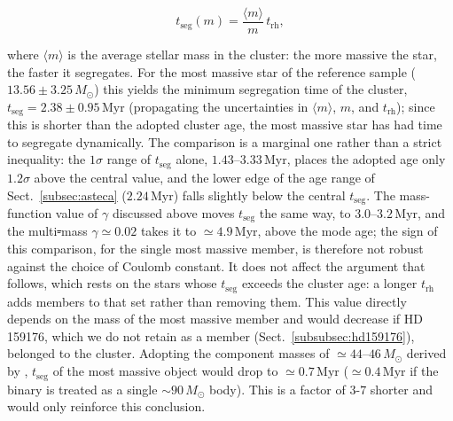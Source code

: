 \documentclass{aa}
\providecommand{\DIFaddtex}[1]{{\protect\color{red}\uwave{#1}}} %
\providecommand{\DIFdeltex}[1]{{\protect\color{red}\sout{#1}}} %
\providecommand{\DIFaddbegin}{} %
\providecommand{\DIFaddend}{} %
\providecommand{\DIFdelbegin}{} %
\providecommand{\DIFdelend}{} %
\providecommand{\DIFadd}[1]{\texorpdfstring{\DIFaddtex{#1}}{#1}} %
\providecommand{\DIFdel}[1]{\texorpdfstring{\DIFdeltex{#1}}{}} %
\providecommand{\DIFscaledelfig}{0.5}
\newlength{\DIFdelgraphicswidth} %
\newlength{\DIFdelgraphicsheight} %
\providecommand{\DIFaddincludegraphics}[2][]{{\color{blue}\fbox{\DIFOincludegraphics[#1]{#2}}}} %
\providecommand{\DIFdelincludegraphics}[2][]{%
\sbox{\DIFdelgraphicsbox}{\DIFOincludegraphics[#1]{#2}}%
\settoboxwidth{\DIFdelgraphicswidth}{\DIFdelgraphicsbox} %
\settoboxtotalheight{\DIFdelgraphicsheight}{\DIFdelgraphicsbox} %
\scalebox{\DIFscaledelfig}{%
\parbox[b]{\DIFdelgraphicswidth}{\usebox{\DIFdelgraphicsbox}\\[-\baselineskip] \rule{\DIFdelgraphicswidth}{0em}}\llap{\resizebox{\DIFdelgraphicswidth}{\DIFdelgraphicsheight}{%
\setlength{\unitlength}{\DIFdelgraphicswidth}%
\begin{picture}(1,1)%
\thicklines\linethickness{2pt} %
{\color[rgb]{1,0,0}\put(0,0){\framebox(1,1){}}}%
{\color[rgb]{1,0,0}\put(0,0){\line( 1,1){1}}}%
{\color[rgb]{1,0,0}\put(0,1){\line(1,-1){1}}}%
\end{picture}%
}\hspace*{3pt}}} %
} %
\DeclareRobustCommand{\DIFaddbegin}{\DIFOaddbegin \let\includegraphics\DIFaddincludegraphics} %
\DeclareRobustCommand{\DIFaddend}{\DIFOaddend \let\includegraphics\DIFOincludegraphics} %
\DeclareRobustCommand{\DIFdelbegin}{\DIFOdelbegin \let\includegraphics\DIFdelincludegraphics} %
\DeclareRobustCommand{\DIFdelend}{\DIFOaddend \let\includegraphics\DIFOincludegraphics} %
\begin{document}
\begin{equation}\label{eq:tseg}
t_{\mathrm{seg}}(m) = \frac{\langle m \rangle}{m}\, t_{\mathrm{rh}},
\end{equation}

where $\langle m \rangle$ is the average stellar mass in the cluster: the more massive the star, the faster it segregates. For the most massive star of the reference sample ($13.56 \pm 3.25\,M_\odot$) this yields the minimum segregation time of the cluster, $t_{\mathrm{seg}} = 2.38 \pm 0.95\,\mathrm{Myr}$ (propagating the uncertainties in $\langle m \rangle$, $m$, and $t_{\mathrm{rh}}$); since this is shorter than the adopted cluster age, the most massive star has had time to segregate dynamically. The comparison is a marginal one rather than a strict inequality: the $1\sigma$ range of $t_{\mathrm{seg}}$ alone, $1.43$--$3.33\,\mathrm{Myr}$, places the adopted age only $1.2\sigma$ above the central value, and the lower edge of the age range of Sect.~\ref{subsec:asteca} ($2.24\,\mathrm{Myr}$) falls slightly below the central $t_{\mathrm{seg}}$. The mass-function value of $\gamma$ discussed above moves $t_{\mathrm{seg}}$ the same way, to $3.0$--$3.2\,\mathrm{Myr}$, and the multi\DIFdelbegin \DIFdel{-}\DIFdelend mass $\gamma\simeq0.02$ takes it to $\simeq4.9\,\mathrm{Myr}$, above the mode age; the sign of this comparison, for the single most massive member, is therefore not robust against the choice of Coulomb constant. It does not affect the argument that follows, which rests on the stars whose $t_{\mathrm{seg}}$ exceeds the cluster age: a longer $t_{\mathrm{rh}}$ adds members to that set rather than removing them. This value directly depends on the mass of the most massive member and would decrease if HD 159176, which we do not retain as a member (Sect.~\ref{subsubsec:hd159176}), belonged to the cluster. Adopting the component masses of $\simeq44$--$46\,M_\odot$ derived by \citet{2016ApJ...832..211P}, $t_{\mathrm{seg}}$ of the most massive object would drop to $\simeq0.7\,\mathrm{Myr}$ ($\simeq0.4\,\mathrm{Myr}$ if the binary is treated as a single $\sim90\,M_\odot$ body). This is a factor of $3$-\DIFaddbegin \DIFadd{-}\DIFaddend  $7$ shorter and would only reinforce this conclusion.
\end{document}
